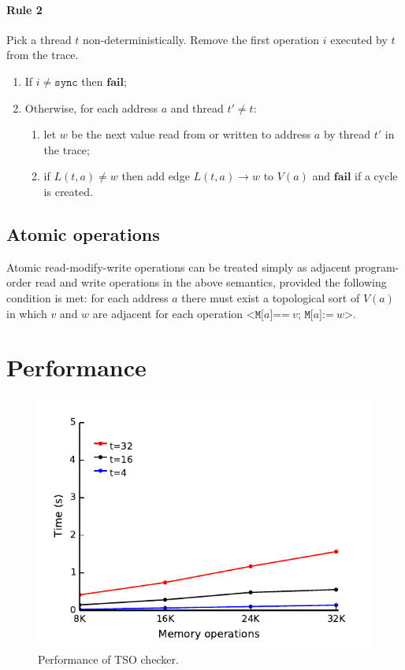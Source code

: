 \documentclass[11pt]{article}
\begin{document}
\paragraph{Rule 2}

Pick a thread $t$ non-deterministically.  Remove the first operation
$i$ executed by $t$ from the trace.

\begin{enumerate}
\item
     If $i \neq \texttt{sync}$ then $\textbf{fail}$;
\item
     Otherwise, for each address $a$ and thread $t' \neq t$:
\begin{enumerate}
\item
     let $w$ be the next value read from or written to address $a$ by
     thread $t'$ in the trace;
\item
     if $L(t,a) \neq w$ then add edge $L(t,a) \rightarrow w$ to $V(a)$
     and $\textbf{fail}$ if a cycle is created.

\end{enumerate}
\end{enumerate}

\subsection*{Atomic operations}

Atomic read-modify-write operations can be treated simply as adjacent
program-order read and write operations in the above semantics,
provided the following condition is met: for each address $a$ there
must exist a topological sort of $V(a)$ in which $v$ and $w$ are
adjacent for each operation $\texttt{<M[}a\texttt{]==}~v\texttt{;
M[}a\texttt{]:=}~w\texttt{>}$.

\section{Performance}
\label{Section:Performance}

\begin{figure}
\begin{center}
\includegraphics{performance/tso.pdf}
\end{center}
\caption{Performance of TSO checker.}
\label{Graph:TSO}
\end{figure}
\end{document}
